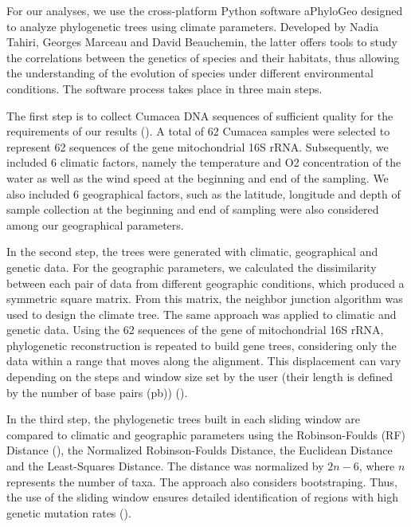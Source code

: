For our analyses, we use the cross-platform Python software aPhyloGeo designed to analyze phylogenetic trees using climate parameters. Developed by Nadia Tahiri, Georges Marceau and David Beauchemin, the latter offers tools to study the correlations between the genetics of species and their habitats, thus allowing the understanding of the evolution of species under different environmental conditions. The software process takes place in three main steps. 

    The first step is to collect Cumacea DNA sequences of sufficient quality for the requirements of our results (\cite{koshkarov_phylogeography_2022}). A total of 62 Cumacea samples were selected to represent 62 sequences of the gene mitochondrial 16S rRNA. Subsequently, we included 6 climatic factors, namely the temperature and O2 concentration of the water as well as the wind speed at the beginning and end of the sampling. We also included 6 geographical factors, such as the latitude, longitude and depth of sample collection at the beginning and end of sampling were also considered among our geographical parameters.

    In the second step, the trees were generated with climatic, geographical and genetic data. For the geographic parameters, we calculated the dissimilarity between each pair of data from different geographic conditions, which produced a symmetric square matrix. From this matrix, the neighbor junction algorithm was used to design the climate tree. The same approach was applied to climatic and genetic data. Using the 62 sequences of the gene of mitochondrial 16S rRNA, phylogenetic reconstruction is repeated to build gene trees, considering only the data within a range that moves along the alignment. This displacement can vary depending on the steps and window size set by the user (their length is defined by the number of base pairs (pb)) (\cite{koshkarov_phylogeography_2022}).

    In the third step, the phylogenetic trees built in each sliding window are compared to climatic and geographic parameters using the Robinson-Foulds (RF) Distance (\cite{robinson_comparison_1981, koshkarov_phylogeography_2022}), the Normalized Robinson-Foulds Distance, the Euclidean Distance and the Least-Squares Distance. The distance was normalized by $2n-6$, where $n$ represents the number of taxa. The approach also considers bootstraping. Thus, the use of the sliding window ensures detailed identification of regions with high genetic mutation rates (\cite{koshkarov_phylogeography_2022}).

